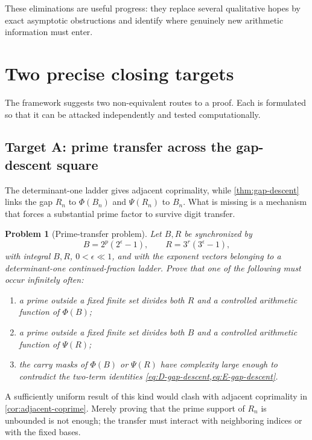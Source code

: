 \documentclass[11pt]{article}
\newtheorem{problem}[theorem]{Problem}
\theoremstyle{definition}
\begin{document}
These eliminations are useful progress: they replace several qualitative
hopes by exact asymptotic obstructions and identify where genuinely new
arithmetic information must enter.

\section{Two precise closing targets}
\label{sec:targets}

The framework suggests two non-equivalent routes to a proof.  Each is
formulated so that it can be attacked independently and tested
computationally.

\subsection{Target A: prime transfer across the gap-descent square}

The determinant-one ladder gives adjacent coprimality, while
\cref{thm:gap-descent} links the gap \(R_n\) to \(\Phi(B_n)\) and
\(\Psi(R_n)\) to \(B_n\).  What is missing is a mechanism that forces a
substantial prime factor to survive digit transfer.

\begin{problem}[Prime-transfer problem]\label{prob:prime-transfer}
Let \(B,R\) be synchronized by
\[
 B=2^p(2^\epsilon-1),
 \qquad
 R=3^r(3^\epsilon-1),
\]
with integral \(B,R\), \(0<\epsilon\ll1\), and with the exponent vectors
belonging to a determinant-one continued-fraction ladder.  Prove that one of
the following must occur infinitely often:
\begin{enumerate}[label=(\alph*)]
\item a prime outside a fixed finite set divides both \(R\) and a controlled
arithmetic function of \(\Phi(B)\);
\item a prime outside a fixed finite set divides both \(B\) and a controlled
arithmetic function of \(\Psi(R)\);
\item the carry masks of \(\Phi(B)\) or \(\Psi(R)\) have complexity large
enough to contradict the two-term identities
\cref{eq:D-gap-descent,eq:E-gap-descent}.
\end{enumerate}
\end{problem}

A sufficiently uniform result of this kind would clash with adjacent
coprimality in \cref{cor:adjacent-coprime}.  Merely proving that the prime
support of \(R_n\) is unbounded is not enough; the transfer must interact
with neighboring indices or with the fixed bases.
\end{document}

